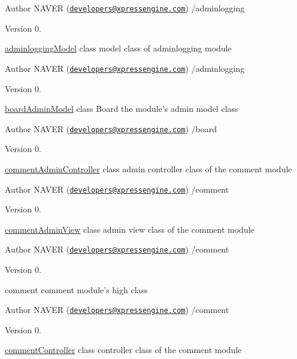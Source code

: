 \begin{DoxyAuthor}{Author}
N\-A\-V\-E\-R (\href{mailto:developers@xpressengine.com}{\tt developers@xpressengine.\-com}) /adminlogging 
\end{DoxyAuthor}
\begin{DoxyVersion}{Version}
0.
\end{DoxyVersion}
\hyperlink{classadminloggingModel}{adminlogging\-Model} class model class of adminlogging module

\begin{DoxyAuthor}{Author}
N\-A\-V\-E\-R (\href{mailto:developers@xpressengine.com}{\tt developers@xpressengine.\-com}) /adminlogging 
\end{DoxyAuthor}
\begin{DoxyVersion}{Version}
0.
\end{DoxyVersion}
\hyperlink{classboardAdminModel}{board\-Admin\-Model} class Board the module's admin model class

\begin{DoxyAuthor}{Author}
N\-A\-V\-E\-R (\href{mailto:developers@xpressengine.com}{\tt developers@xpressengine.\-com}) /board 
\end{DoxyAuthor}
\begin{DoxyVersion}{Version}
0.
\end{DoxyVersion}
\hyperlink{classcommentAdminController}{comment\-Admin\-Controller} class admin controller class of the comment module

\begin{DoxyAuthor}{Author}
N\-A\-V\-E\-R (\href{mailto:developers@xpressengine.com}{\tt developers@xpressengine.\-com}) /comment 
\end{DoxyAuthor}
\begin{DoxyVersion}{Version}
0.
\end{DoxyVersion}
\hyperlink{classcommentAdminView}{comment\-Admin\-View} class admin view class of the comment module

\begin{DoxyAuthor}{Author}
N\-A\-V\-E\-R (\href{mailto:developers@xpressengine.com}{\tt developers@xpressengine.\-com}) /comment 
\end{DoxyAuthor}
\begin{DoxyVersion}{Version}
0.
\end{DoxyVersion}
comment comment module's high class

\begin{DoxyAuthor}{Author}
N\-A\-V\-E\-R (\href{mailto:developers@xpressengine.com}{\tt developers@xpressengine.\-com}) /comment 
\end{DoxyAuthor}
\begin{DoxyVersion}{Version}
0.
\end{DoxyVersion}
\hyperlink{classcommentController}{comment\-Controller} class controller class of the comment module

